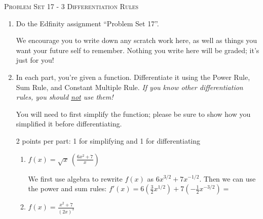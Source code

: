 \documentclass{article}
\newcommand{\doedfinity}[2][\newpage]{
  \begin{problem}[#1]
    Do the Edfinity assignment ``Problem Set #2''.

    We encourage you to write down any scratch work here, as well as
    things you want your future self to remember. Nothing you write
    here will be graded; it's just for you!
  \end{problem}
}
\begin{document}
\begin{center}
  \large\textsc{Problem Set 17 - 3 Differentiation Rules}
\end{center}

\begin{enumerate}
\item  {}

  \doedfinity{17}

\item  

  In each part, you're given a function. Differentiate it using the Power Rule, Sum Rule, and Constant Multiple Rule. \emph{If you know other differentiation rules, you should \uline{not} use them!}

  You will need to first simplify the function; please be sure to show how you simplified it before differentiating.

  \begin{grading}
    2 points per part: 1 for simplifying and 1 for differentiating 
  \end{grading}

  \begin{enumerate}

  \item
    \begin{problem}[\vfill]
      $f(x) =\displaystyle \sqrt x \, \left( \frac{6x^2 + 7}{x}\right)
      $
    \end{problem}

    \begin{solution}
      We first use algebra to rewrite $f(x)$ as $6x^{3/2} + 7x^{-1/2}$. 
      Then we can use the power and sum rules: $f'(x) = 6(\frac{3}{2}x^{1/2}) + 
      7(-\frac{1}{2}x^{-3/2}) =$ 
    \end{solution}

  \item

    \begin{problem}[\vfill]
      $f(x) =\displaystyle \frac{x^2 + 7}{(2x)^3}$
    \end{problem}


\end{enumerate}
\end{enumerate}
\end{document}
